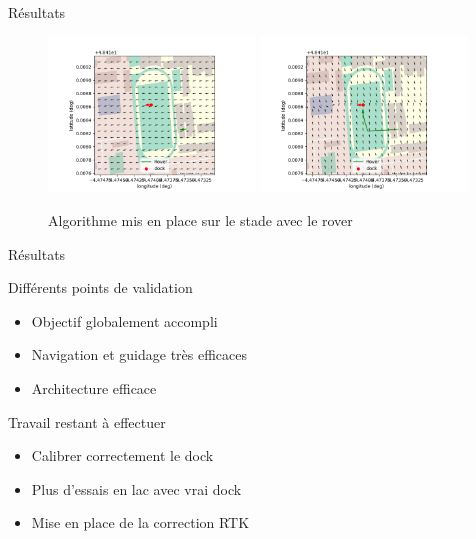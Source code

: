 \documentclass[pdftex,beamer,aspectratio=169]{beamer}
\theoremstyle{definition}
\theoremstyle{example}
\theoremstyle{plain}
\begin{document}
\begin{frame}[fragile]{Résultats}
  \begin{figure}
    \centering
    \includegraphics[width=0.49\textwidth]{visu_2.png}
    \includegraphics[width=0.49\textwidth]{visu_1.png}
    \caption*{Algorithme mis en place sur le stade avec le rover}
  \end{figure}
\end{frame}

\begin{frame}[fragile]{Résultats}
  \begin{minipage}{0.49\textwidth}
    Différents points de validation
    \begin{itemize}
      \item Objectif globalement accompli
      \item Navigation et guidage très efficaces
      \item Architecture efficace
    \end{itemize}
  \end{minipage}
  \begin{minipage}{0.49\textwidth}
    Travail restant à effectuer
    \begin{itemize}
      \item Calibrer correctement le dock
      \item Plus d'essais en lac avec vrai dock
      \item Mise en place de la correction RTK
    \end{itemize}
  \end{minipage}
\end{frame}
\end{document}
